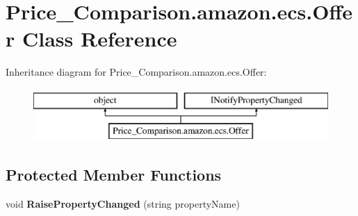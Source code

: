 \hypertarget{class_price___comparison_1_1amazon_1_1ecs_1_1_offer}{\section{Price\-\_\-\-Comparison.\-amazon.\-ecs.\-Offer Class Reference}
\label{class_price___comparison_1_1amazon_1_1ecs_1_1_offer}
}


 


Inheritance diagram for Price\-\_\-\-Comparison.\-amazon.\-ecs.\-Offer\-:\begin{figure}[H]
\begin{center}
\leavevmode
\includegraphics[height=2.000000cm]{class_price___comparison_1_1amazon_1_1ecs_1_1_offer}
\end{center}
\end{figure}
\subsection*{Protected Member Functions}
\begin{DoxyCompactItemize}
\item 
\hypertarget{class_price___comparison_1_1amazon_1_1ecs_1_1_offer_a27d60365317410f4c6161f818170f500}{void {\bfseries Raise\-Property\-Changed} (string property\-Name)}\label{class_price___comparison_1_1amazon_1_1ecs_1_1_offer_a27d60365317410f4c6161f818170f500}

\end{DoxyCompactItemize}
